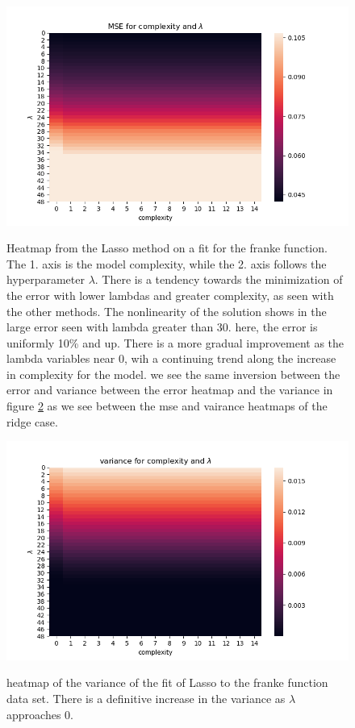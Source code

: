 \documentclass[ 12pt, a4paper ]{article}
\begin{document}
\begin{figure}[H]
\includegraphics[scale=0.7]{frankelassomseheatmap.png}
\label{fig:frankelassomseheatmap}
\caption{
    Heatmap from the Lasso method on a fit for the franke function. The 1. axis is the model
    complexity, while the 2. axis follows the hyperparameter $\lambda$. There is a tendency
    towards the minimization of the error with lower lambdas and greater complexity, as seen
    with the other methods. The nonlinearity of the solution shows in the large error seen
    with lambda greater than 30. here, the error is uniformly 10\% and up. There is a more 
    gradual improvement as the lambda variables near 0, wih a continuing trend along the increase
    in complexity for the model. we see the same inversion between the error and variance between
    the error heatmap and the variance in figure \ref{fig:frankelassovarianceheatmap} as we see
    between the mse and vairance heatmaps of the ridge case. 
}
\end{figure}

\begin{figure}[H]
\includegraphics[scale=0.7]{frankelassovarianceheatmap.png}
\label{fig:frankelassovarianceheatmap}
\caption{
    heatmap of the variance of the fit of Lasso to the franke function data set. There is 
    a definitive increase in the variance as $\lambda$ approaches 0. 
}
\end{figure}
\end{document}
